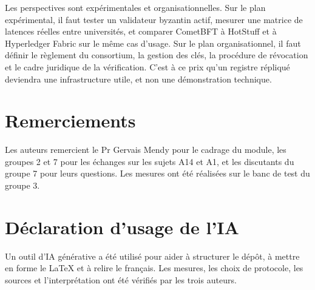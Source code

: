 \documentclass[conference]{IEEEtran}
\begin{document}
Les perspectives sont expérimentales et organisationnelles. Sur le plan expérimental, il faut tester un validateur byzantin actif, mesurer une matrice de latences réelles entre universités, et comparer CometBFT à HotStuff et à Hyperledger Fabric sur le même cas d'usage. Sur le plan organisationnel, il faut définir le règlement du consortium, la gestion des clés, la procédure de révocation et le cadre juridique de la vérification. C'est à ce prix qu'un registre répliqué deviendra une infrastructure utile, et non une démonstration technique.

\section*{Remerciements}

Les auteurs remercient le Pr Gervais Mendy pour le cadrage du module, les groupes 2 et 7 pour les échanges sur les sujets A14 et A1, et les discutants du groupe 7 pour leurs questions. Les mesures ont été réalisées sur le banc de test du groupe 3.

\section*{Déclaration d'usage de l'IA}

Un outil d'IA générative a été utilisé pour aider à structurer le dépôt, à mettre en forme le LaTeX et à relire le français. Les mesures, les choix de protocole, les sources et l'interprétation ont été vérifiés par les trois auteurs.


\end{document}
